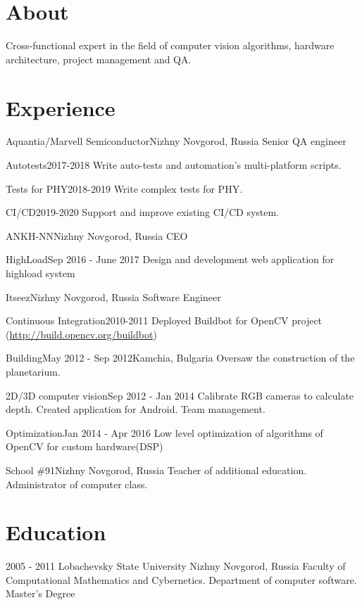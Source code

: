 \documentclass[11pt,a4paper]{moderncv}
\begin{document}
\maketitle

\section{About}
Cross-functional expert in the field of computer vision algorithms, hardware architecture, project management and QA.

\section{Experience}
	{Aquantia/Marvell Semiconductor}{Nizhny Novgorod, Russia}{}{}
  	{Senior QA engineer}
  	
\cventry{}
	{Autotests}{2017-2018}{}{}
	{Write auto-tests and automation's multi-platform scripts.}
  
\cventry{}
	{Tests for PHY}{2018-2019}{}{}
	{Write complex tests for PHY.}

\cventry{}
	{CI/CD}{2019-2020}{}{}
	{Support and improve existing CI/CD system.}

	{ANKH-NN}{Nizhny Novgorod, Russia}{}{}
  	{CEO}
  
\cventry{}
	{HighLoad}{Sep 2016 - June 2017}{}{}
	{Design and development web application for highload system}
 
	{Itseez}{Nizhny Novgorod, Russia}{}{}
	{Software Engineer}
  
\cventry{}
	{Continuous Integration}{2010-2011}{}{}
	{Deployed Buildbot for OpenCV project (\url{http://build.opencv.org/buildbot})}

\cventry{}
	{Building}{May 2012 - Sep 2012}{Kamchia, Bulgaria}{}
	{Oversaw the construction of the planetarium.}

\cventry{}
	{2D/3D computer vision}{Sep 2012 - Jan 2014}{} {}
	{Calibrate RGB cameras to calculate depth. Created application for Android. Team management.}

\cventry{}
	{Optimization}{Jan 2014 - Apr 2016}{}{}   
	{Low level optimization of algorithms of OpenCV for custom hardware(DSP)}

	{School \#91}{Nizhny Novgorod, Russia}{}{}
	{Teacher of additional education. Administrator of computer class.}
  
\section{Education}
  \cventry
    {2005 - 2011}
    {Lobachevsky State University}
    {Nizhny Novgorod, Russia}
    {}{}
    {Faculty of Computational Mathematics and Cybernetics. Department of computer software.\newline{}
    Master's Degree}
\end{document}

